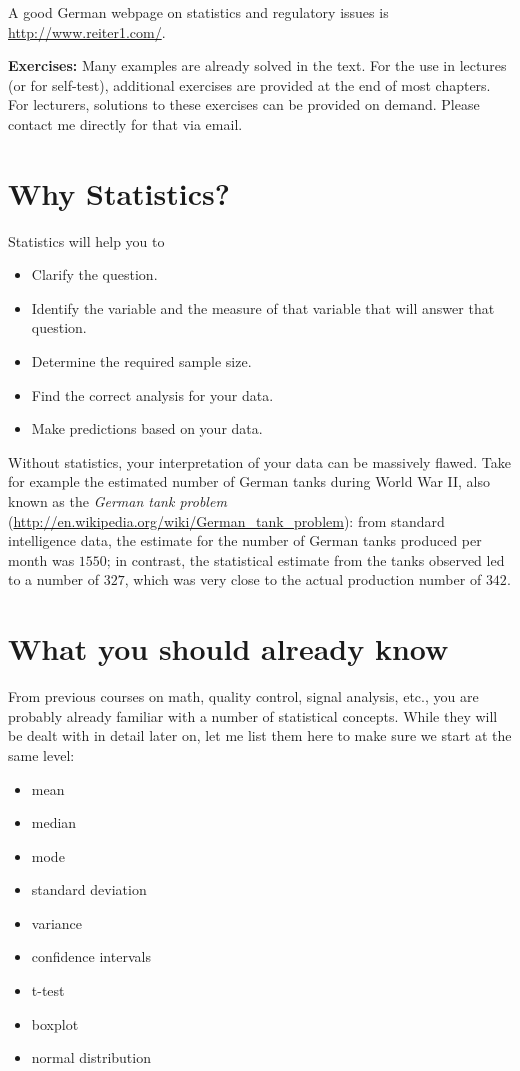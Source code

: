  A good German webpage on statistics and regulatory issues is \url{http://www.reiter1.com/}.

\vspace{5 mm}

\textbf{Exercises: }Many examples are already solved in the text. For the use in lectures (or for self-test), additional exercises are provided at the end of most chapters. For lecturers, solutions to these exercises can be provided on demand. Please contact me directly for that via email.

\section{Why Statistics?}

Statistics will help you to
\begin{itemize}
  \item Clarify the question.
  \item Identify the variable and the measure of that variable that will answer that question.
  \item Determine the required sample size.
  \item Find the correct analysis for your data.
  \item Make predictions based on your data.
\end{itemize}

Without statistics, your interpretation of your data can be massively flawed. Take for example the estimated number of German tanks during World War II, also known as the \emph{German tank problem} (\url{http://en.wikipedia.org/wiki/German_tank_problem}): from standard intelligence data, the estimate for the number of German tanks produced per month was $1550$; in contrast, the statistical estimate from the tanks observed led to a number of $327$, which was very close to the actual production number of $342$.

\section{What you should already know}

From previous courses on math, quality control, signal analysis, etc., you are probably already familiar with a number of statistical concepts. While they will be dealt with in detail later on, let me list them here to make sure we start at the same level:

\begin{itemize}
  \item mean
  \item median
  \item mode
  \item standard deviation
  \item variance
  \item confidence intervals
  \item t-test
  \item boxplot
  \item normal distribution
\end{itemize}

